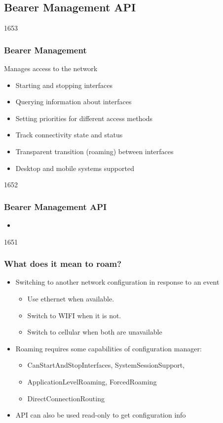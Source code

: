 \subsection{Bearer Management API}

\begin{slide}{1653}
\frametitle{Bearer Management}
Manages access to the network
\begin{itemize}
\item Starting and stopping interfaces
\item Querying information about interfaces
\item Setting priorities for different access methods
\item Track connectivity state and status
\item Transparent transition (roaming) between interfaces
\item Desktop and mobile systems supported
\end{itemize}
\end{slide}

\begin{slide}{1652}
  \frametitle{Bearer Management API}
  \begin{itemize}
    \item[] 
  \end{itemize}
\end{slide}


\begin{slide}{1651}
\frametitle{What does it mean to roam?}
\begin{itemize}
\item Switching to another network configuration in response to an event
    \begin{itemize}
    \item Use ethernet when available.
    \item Switch to WIFI when it is not.
    \item Switch to cellular when both are unavailable
    \end{itemize}
\item Roaming requires some capabilities of configuration manager:
    \begin{itemize}
    \item CanStartAndStopInterfaces, SystemSessionSupport,  
    \item ApplicationLevelRoaming, ForcedRoaming
    \item DirectConnectionRouting
    \end{itemize}
\item API can also be used read-only to get configuration info
\end{itemize} 
\end{slide}

